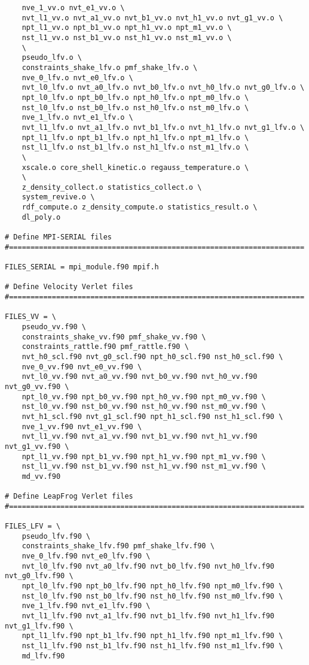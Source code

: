 \begin{verbatim}
	nve_1_vv.o nvt_e1_vv.o \
	nvt_l1_vv.o nvt_a1_vv.o nvt_b1_vv.o nvt_h1_vv.o nvt_g1_vv.o \
	npt_l1_vv.o npt_b1_vv.o npt_h1_vv.o npt_m1_vv.o \
	nst_l1_vv.o nst_b1_vv.o nst_h1_vv.o nst_m1_vv.o \
	\
	pseudo_lfv.o \
	constraints_shake_lfv.o pmf_shake_lfv.o \
	nve_0_lfv.o nvt_e0_lfv.o \
	nvt_l0_lfv.o nvt_a0_lfv.o nvt_b0_lfv.o nvt_h0_lfv.o nvt_g0_lfv.o \
	npt_l0_lfv.o npt_b0_lfv.o npt_h0_lfv.o npt_m0_lfv.o \
	nst_l0_lfv.o nst_b0_lfv.o nst_h0_lfv.o nst_m0_lfv.o \
	nve_1_lfv.o nvt_e1_lfv.o \
	nvt_l1_lfv.o nvt_a1_lfv.o nvt_b1_lfv.o nvt_h1_lfv.o nvt_g1_lfv.o \
	npt_l1_lfv.o npt_b1_lfv.o npt_h1_lfv.o npt_m1_lfv.o \
	nst_l1_lfv.o nst_b1_lfv.o nst_h1_lfv.o nst_m1_lfv.o \
	\
	xscale.o core_shell_kinetic.o regauss_temperature.o \
	\
	z_density_collect.o statistics_collect.o \
	system_revive.o \
	rdf_compute.o z_density_compute.o statistics_result.o \
	dl_poly.o

# Define MPI-SERIAL files
#=====================================================================

FILES_SERIAL = mpi_module.f90 mpif.h

# Define Velocity Verlet files
#=====================================================================

FILES_VV = \
	pseudo_vv.f90 \
	constraints_shake_vv.f90 pmf_shake_vv.f90 \
	constraints_rattle.f90 pmf_rattle.f90 \
	nvt_h0_scl.f90 nvt_g0_scl.f90 npt_h0_scl.f90 nst_h0_scl.f90 \
	nve_0_vv.f90 nvt_e0_vv.f90 \
	nvt_l0_vv.f90 nvt_a0_vv.f90 nvt_b0_vv.f90 nvt_h0_vv.f90 nvt_g0_vv.f90 \
	npt_l0_vv.f90 npt_b0_vv.f90 npt_h0_vv.f90 npt_m0_vv.f90 \
	nst_l0_vv.f90 nst_b0_vv.f90 nst_h0_vv.f90 nst_m0_vv.f90 \
	nvt_h1_scl.f90 nvt_g1_scl.f90 npt_h1_scl.f90 nst_h1_scl.f90 \
	nve_1_vv.f90 nvt_e1_vv.f90 \
	nvt_l1_vv.f90 nvt_a1_vv.f90 nvt_b1_vv.f90 nvt_h1_vv.f90 nvt_g1_vv.f90 \
	npt_l1_vv.f90 npt_b1_vv.f90 npt_h1_vv.f90 npt_m1_vv.f90 \
	nst_l1_vv.f90 nst_b1_vv.f90 nst_h1_vv.f90 nst_m1_vv.f90 \
	md_vv.f90

# Define LeapFrog Verlet files
#=====================================================================

FILES_LFV = \
	pseudo_lfv.f90 \
	constraints_shake_lfv.f90 pmf_shake_lfv.f90 \
	nve_0_lfv.f90 nvt_e0_lfv.f90 \
	nvt_l0_lfv.f90 nvt_a0_lfv.f90 nvt_b0_lfv.f90 nvt_h0_lfv.f90 nvt_g0_lfv.f90 \
	npt_l0_lfv.f90 npt_b0_lfv.f90 npt_h0_lfv.f90 npt_m0_lfv.f90 \
	nst_l0_lfv.f90 nst_b0_lfv.f90 nst_h0_lfv.f90 nst_m0_lfv.f90 \
	nve_1_lfv.f90 nvt_e1_lfv.f90 \
	nvt_l1_lfv.f90 nvt_a1_lfv.f90 nvt_b1_lfv.f90 nvt_h1_lfv.f90 nvt_g1_lfv.f90 \
	npt_l1_lfv.f90 npt_b1_lfv.f90 npt_h1_lfv.f90 npt_m1_lfv.f90 \
	nst_l1_lfv.f90 nst_b1_lfv.f90 nst_h1_lfv.f90 nst_m1_lfv.f90 \
	md_lfv.f90


\end{verbatim}
